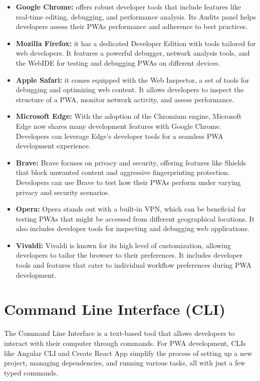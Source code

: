 \documentclass[conference]{IEEEtran}
\begin{document}
\begin{itemize}
  \item \textbf{Google Chrome:} offers robust developer tools that include features like real-time editing, debugging, and performance analysis. Its Audits panel helps developers assess their PWAs performance and adherence to best practices.
  \item \textbf{Mozilla Firefox:} it has a dedicated Developer Edition with tools tailored for web developers. It features a powerful debugger, network analysis tools, and the WebIDE for testing and debugging PWAs on different devices.
  \item \textbf{Apple Safari:} it comes equipped with the Web Inspector, a set of tools for debugging and optimizing web content. It allows developers to inspect the structure of a PWA, monitor network activity, and assess performance.
  \item \textbf{Microsoft Edge:} With the adoption of the Chromium engine, Microsoft Edge now shares many development features with Google Chrome. Developers can leverage Edge's developer tools for a seamless PWA development experience.
  \item \textbf{Brave:} Brave focuses on privacy and security, offering features like Shields that block unwanted content and aggressive fingerprinting protection. Developers can use Brave to test how their PWAs perform under varying privacy and security scenarios.
  \item \textbf{Opera:} Opera stands out with a built-in VPN, which can be beneficial for testing PWAs that might be accessed from different geographical locations. It also includes developer tools for inspecting and debugging web applications.
  \item \textbf{Vivaldi:} Vivaldi is known for its high level of customization, allowing developers to tailor the browser to their preferences. It includes developer tools and features that cater to individual workflow preferences during PWA development.
\end{itemize}

\section{Command Line Interface (CLI)}
The Command Line Interface is a text-based tool that allows developers to interact with their computer through commands. For PWA development, CLIs like Angular CLI and Create React App simplify the process of setting up a new project, managing dependencies, and running various tasks, all with just a few typed commands.
\end{document}
